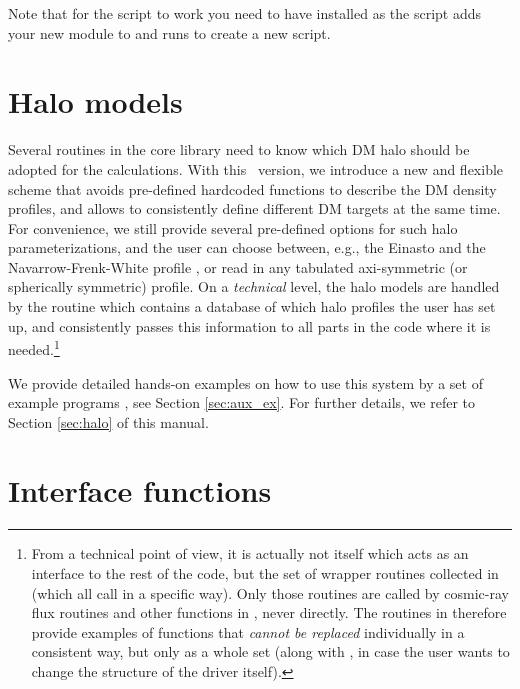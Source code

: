 Note that for the  script to work you need to have  installed as the script adds your new module to  and runs  to create a new  script.

\section{Halo models}
\label{sec:halo_general}

Several routines in the core library need to know which DM halo should be adopted for the 
calculations. With this \ds\ version, we introduce a new and flexible scheme that avoids 
pre-defined hardcoded functions to describe the DM density profiles, and allows to 
consistently define different DM targets at the same time. For convenience, we still provide
several pre-defined options for such halo parameterizations, and the user can choose 
between, e.g., the Einasto \cite{1965TrAlm...5...87E} and the Navarrow-Frenk-White profile 
\cite{Navarro:1995iw}, or read in any tabulated axi-symmetric (or spherically symmetric) profile. 
On a {\it technical} level, the halo models are handled by the  routine which 
contains a database of which  halo profiles the user has set up, and consistently passes this
information to all parts in the code where it is needed.\footnote{
From a technical point of view, it is actually not   itself which acts as an interface
to the rest of the code, but the set of wrapper routines collected in  (which all call 
in a specific way). Only those routines are called by 
cosmic-ray flux routines and other functions in , never  directly.
The routines in   therefore provide examples of functions that {\it cannot be
replaced} individually in a consistent way, but only as a whole set (along with ,
in case the user wants to change the structure of the driver itself).  
} 

We provide detailed hands-on examples on how to use this system by a set of example
programs , see Section \ref{sec:aux_ex}. For further details, we refer
to Section \ref{sec:halo} of this manual.


\section{Interface functions}
\label{sec:interface}


